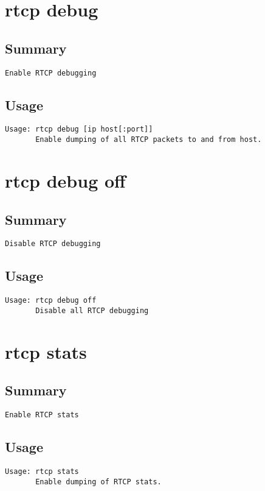 \section{rtcp debug}
\subsection{Summary}
\begin{verbatim}
Enable RTCP debugging
\end{verbatim}
\subsection{Usage}
\begin{verbatim}
Usage: rtcp debug [ip host[:port]]
       Enable dumping of all RTCP packets to and from host.

\end{verbatim}


\section{rtcp debug off}
\subsection{Summary}
\begin{verbatim}
Disable RTCP debugging
\end{verbatim}
\subsection{Usage}
\begin{verbatim}
Usage: rtcp debug off
       Disable all RTCP debugging

\end{verbatim}


\section{rtcp stats}
\subsection{Summary}
\begin{verbatim}
Enable RTCP stats
\end{verbatim}
\subsection{Usage}
\begin{verbatim}
Usage: rtcp stats
       Enable dumping of RTCP stats.

\end{verbatim}


